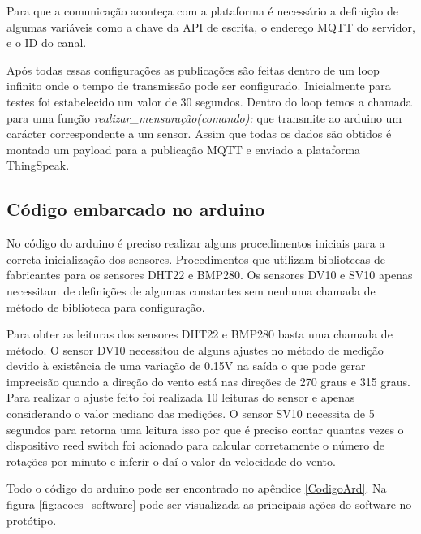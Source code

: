 Para que a comunicação aconteça com a plataforma é necessário a definição de algumas variáveis como a chave da API de escrita, o endereço MQTT do servidor, e o ID do canal.

Após todas essas configurações as publicações são feitas dentro de um loop infinito onde o tempo de transmissão pode ser configurado. Inicialmente para testes foi estabelecido um valor de 30 segundos. Dentro do loop temos a chamada para uma função \emph{realizar\_mensuração(comando):} que transmite ao arduino um carácter correspondente a um sensor. Assim que todas os dados são obtidos é montado um payload para a publicação MQTT e enviado a plataforma ThingSpeak.

\subsection{Código embarcado no arduino}

No código do arduino é preciso realizar alguns procedimentos iniciais para a correta inicialização dos sensores. Procedimentos que utilizam bibliotecas de fabricantes para os sensores DHT22 e BMP280. Os sensores DV10 e SV10 apenas necessitam de definições de algumas constantes sem nenhuma chamada de método de biblioteca para configuração.

Para obter as leituras dos sensores DHT22 e BMP280 basta uma chamada de método. O sensor DV10 necessitou de alguns ajustes no método de medição devido à existência de uma variação de 0.15V na saída o que pode gerar imprecisão quando a direção do vento está nas direções de 270 graus e 315 graus. Para realizar o ajuste feito foi realizada 10 leituras do sensor e apenas considerando o valor mediano das medições. O sensor SV10 necessita de 5 segundos para retorna uma leitura isso por que é preciso contar quantas vezes o dispositivo reed switch foi acionado para calcular corretamente o número de rotações por minuto e inferir o daí o valor da velocidade do vento.

Todo o código do arduino pode ser encontrado no apêndice \ref{CodigoArd}. Na figura \ref{fig:acoes_software} pode ser visualizada as principais ações do software no protótipo.

